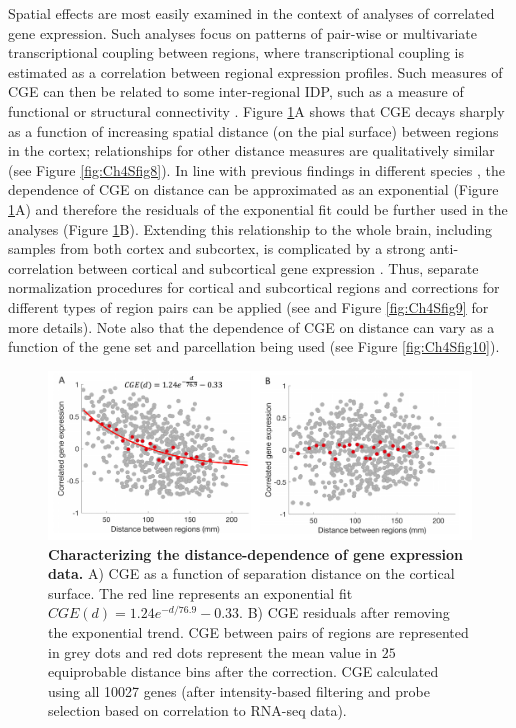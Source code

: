 \documentclass[10pt,A4]{article}
\begin{document}
Spatial effects are most easily examined in the context of analyses of correlated gene expression. Such analyses focus on patterns of pair-wise or multivariate transcriptional coupling between regions, where transcriptional coupling is estimated as a correlation between regional expression profiles. Such measures of CGE can then be related to some inter-regional IDP, such as a measure of functional or structural connectivity \citep{Richiardi2015,Fulcher2016,Arnatkeviciute2018}. Figure \ref{fig:Ch4Fig8}A shows that CGE decays sharply as a function of increasing spatial distance (on the pial surface) between regions in the cortex; relationships for other distance measures are qualitatively similar (see Figure \ref{fig:Ch4Sfig8}). In line with previous findings in different species \citep{Fulcher2016,Arnatkeviciute2018}, the dependence of CGE on distance can be approximated as an exponential (Figure \ref{fig:Ch4Fig8}A) and therefore the residuals of the exponential fit could be further used in the analyses (Figure \ref{fig:Ch4Fig8}B). Extending this relationship to the whole brain, including samples from both cortex and subcortex, is complicated by a strong anti-correlation between cortical and subcortical gene expression \citep{Hawrylycz2015}. Thus, separate normalization procedures for cortical and subcortical regions and corrections for different types of region pairs can be applied (see  and Figure \ref{fig:Ch4Sfig9} for more details). Note also that the dependence of CGE on distance can vary as a function of the gene set and parcellation being used (see Figure \ref{fig:Ch4Sfig10}).

\begin{figure}[h]
  \centering
    \includegraphics[width=1\textwidth]{Ch4Fig8.pdf}
\caption{\textbf{Characterizing the distance-dependence of gene expression data.}
A) CGE as a function of separation distance on the cortical surface. The red line represents an exponential fit $CGE(d) = 1.24e^{-d/76.9}-0.33$.
B) CGE residuals after removing the exponential trend. CGE between pairs of regions are represented in grey dots and red dots represent the mean value in $25$ equiprobable distance bins after the correction. CGE calculated using all \num{10027} genes (after intensity-based filtering and probe selection based on correlation to RNA-seq data).}
\label{fig:Ch4Fig8}
\end{figure}
\end{document}
